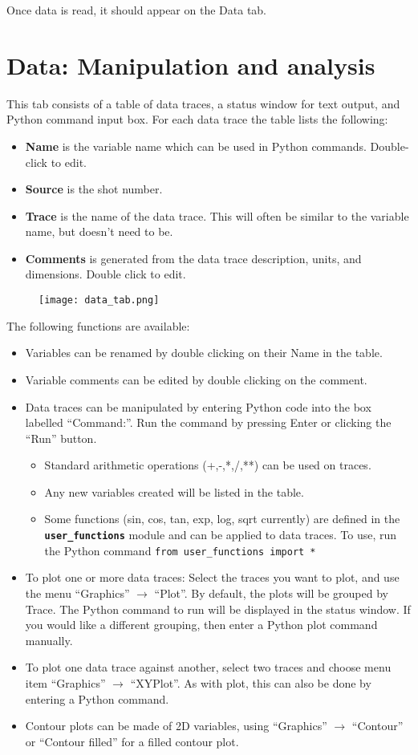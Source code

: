 \documentclass[12pt, a4paper]{article}
\newcommand{\code}[1]{\texttt{#1}}
\newcommand{\file}[1]{\texttt{\bf #1}}
\begin{document}
Once data is read, it should appear on the Data tab.

\section{Data: Manipulation and analysis} 

This tab consists of a table of data traces, a status window for text output, and Python
command input box. For each data trace the table lists the following:
\begin{itemize}
\item {\bf Name} is the variable name which can be used in Python commands. Double-click to edit.
\item {\bf Source} is the shot number.
\item {\bf Trace} is the name of the data trace. This will often be similar to the variable name, but doesn't need to be.
\item {\bf Comments} is generated from the data trace description, units, and dimensions. Double click to edit.
\end{itemize}
\begin{figure}[h!]
  \centering
  \texttt{[image: data\_tab.png]}
  \caption{}
  \label{fig:data_tab}
\end{figure}
The following functions are available:
\begin{itemize}
\item Variables can be renamed by double clicking on their Name in the table.
\item Variable comments can be edited by double clicking on the comment.
\item Data traces can be manipulated by entering Python code into the box labelled 
  ``Command:''. Run the command by pressing Enter or clicking the ``Run'' button. 
\begin{itemize}
\item Standard arithmetic operations (+,-,*,/,**) can be used on traces.
\item Any new variables created will be listed in the table.
\item Some functions (sin, cos, tan, exp, log, sqrt currently) are defined in the \file{user\_functions} module and can be applied to data traces. To use, run the Python command \code{from user\_functions import *}
\end{itemize} 
\item To plot one or more data traces: Select the traces you want to plot, and use the menu ``Graphics'' $\rightarrow$ ``Plot''. By default, the plots will be grouped by Trace. The Python command to run will be displayed in the status window. If you would like a different grouping, then enter a Python plot command manually.
\item To plot one data trace against another, select two traces and choose menu item ``Graphics'' $\rightarrow$ ``XYPlot''. As with plot, this can also be done by entering a Python command.
\item Contour plots can be made of 2D variables, using ``Graphics'' $\rightarrow$ ``Contour'' or ``Contour filled'' for a filled contour plot.
\end{itemize}
\end{document}
